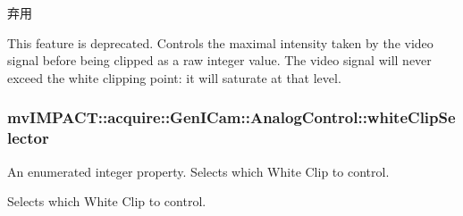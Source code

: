 \begin{DoxyRefDesc}{弃用}
\item[\hyperlink{deprecated__deprecated000050}{弃用}]This feature is deprecated. Controls the maximal intensity taken by the video signal before being clipped as a raw integer value. The video signal will never exceed the white clipping point\+: it will saturate at that level. \end{DoxyRefDesc}
\hypertarget{classmv_i_m_p_a_c_t_1_1acquire_1_1_gen_i_cam_1_1_analog_control_ac5ca7e257c6325adf4f1f43d17d3f3cb}{
\subsubsection[{white\+Clip\+Selector}]{ mv\+I\+M\+P\+A\+C\+T\+::acquire\+::\+Gen\+I\+Cam\+::\+Analog\+Control\+::white\+Clip\+Selector}}\label{classmv_i_m_p_a_c_t_1_1acquire_1_1_gen_i_cam_1_1_analog_control_ac5ca7e257c6325adf4f1f43d17d3f3cb}


An enumerated integer property. Selects which White Clip to control. 

Selects which White Clip to control.

